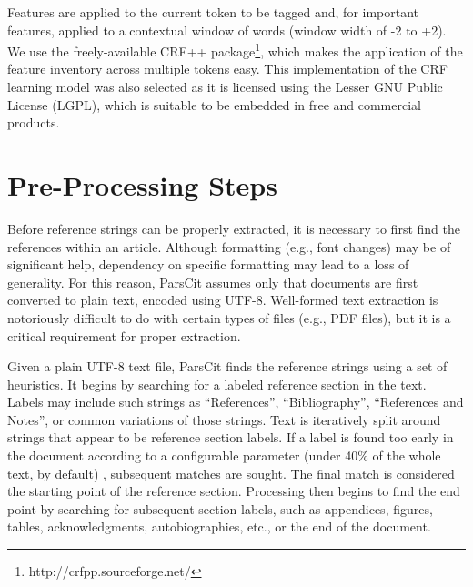 \documentclass[10pt, a4paper]{article}
\begin{document}
Features are applied to the current token to be tagged and, for
important features, applied to a contextual window of words (window
width of -2 to +2).  We use the freely-available CRF++
package\footnote{http://crfpp.sourceforge.net/}, which makes the
application of the feature inventory across multiple tokens easy.
This implementation of the CRF learning model was also selected as it
is licensed using the Lesser GNU Public License (LGPL), which is
suitable to be embedded in free and commercial products.

\section{Pre-Processing Steps}

Before reference strings can be properly extracted, it is necessary to
first find the references within an article. Although formatting
(e.g., font changes) may be of significant help, dependency on
specific formatting may lead to a loss of generality.  For this
reason, ParsCit assumes only that documents are first converted to
plain text, encoded using UTF-8.  Well-formed text extraction is
notoriously difficult to do with certain types of files (e.g., PDF
files), but it is a critical requirement for proper extraction.

Given a plain UTF-8 text file, ParsCit finds the reference strings
using a set of heuristics.  It begins by searching for a labeled
reference section in the text. Labels may include such strings as
``References'', ``Bibliography'', ``References and Notes'', or common
variations of those strings. Text is iteratively split around strings
that appear to be reference section labels. If a label is found too
early in the document according to a configurable parameter (under
40\% of the whole text, by default) , subsequent matches are sought.
The final match is considered the starting point of the reference
section.  Processing then begins to find the end point by searching
for subsequent section labels, such as appendices, figures, tables,
acknowledgments, autobiographies, etc., or the end of the document.
\end{document}
